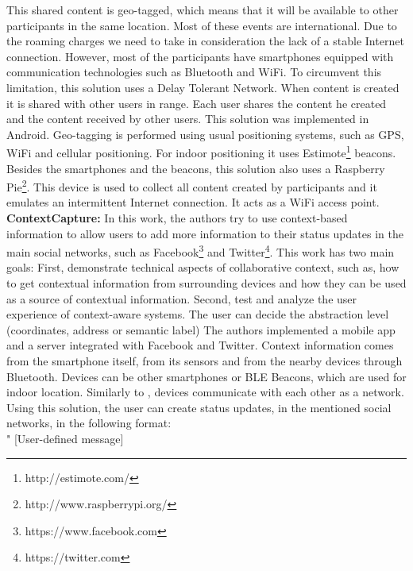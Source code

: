 This shared content is geo-tagged, which means that
it will be available to other participants in the same
location.
Most of these events are international. Due to the
roaming charges we need to take in consideration
the lack of a stable Internet connection.
However, most of the participants have smartphones
equipped with communication technologies such as
Bluetooth and WiFi.
To circumvent this limitation, this solution
uses a Delay Tolerant Network.
When content is created it is shared with other
users in range. Each user shares the content he
created and the content received by other users.
This solution was implemented in Android.
Geo-tagging is performed using usual positioning
systems, such as GPS, WiFi and cellular positioning.
For indoor positioning it uses 
Estimote\footnote{http://estimote.com/} beacons.
Besides the smartphones and the beacons, this
solution also uses a 
Raspberry Pie\footnote{http://www.raspberrypi.org/}.
This device is used to collect all content created by
participants and it emulates an intermittent Internet
connection. It acts as a WiFi access point.
\\
\textbf{ContextCapture:}
In this work\cite{Antila2011}, the authors try to use
context-based information to allow users to
add more information to their status updates
in the main social networks, such as
Facebook\footnote{https://www.facebook.com} and 
Twitter\footnote{https://twitter.com}.
This work has two main goals: First, demonstrate technical
aspects of collaborative context, such as,
how to get contextual information from
surrounding devices and how they can be used
as a source of contextual information.
Second, test and analyze the user experience of
context-aware systems.
The user can decide the abstraction level (coordinates,
address or semantic label)
The authors implemented a mobile app and a
server integrated with Facebook and Twitter.
Context information comes from the smartphone itself,
from its sensors and from the nearby devices through
Bluetooth. 
Devices can be other smartphones or BLE Beacons, which
are used for indoor location.
Similarly to \cite{BenAbdesslem2014}, devices communicate
with each other as a network.
Using this solution, the user can create status updates,
in the mentioned social networks, in the following format:
\\
"
[User-defined message] 

